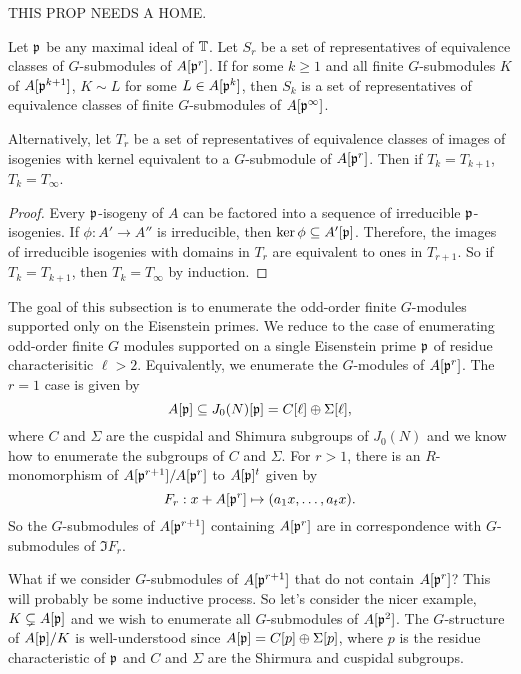 \documentclass{article}
\begin{document}
THIS PROP NEEDS A HOME.
\begin{proposition}\label{prop:powers_of_primes}
    Let $\mathfrak{p}$ be any maximal ideal of $\mathbb{T}$. Let $S_r$ be a set of
    representatives of equivalence classes of $G$-submodules of $A[\mathfrak{p}^r]$. If
    for some $k\geq 1$ and all finite $G$-submodules $K$ of $A[\mathfrak{p}^{k+1}]$,
    $K\sim L$ for some $L\in A[\mathfrak{p}^k]$, then $S_k$ is a set of representatives
    of equivalence classes of finite $G$-submodules of $A[\mathfrak{p}^\infty]$.

    Alternatively, let $T_r$ be a set of representatives of equivalence classes
    of images of isogenies with kernel equivalent to a $G$-submodule of
    $A[\mathfrak{p}^r]$. Then if $T_{k}=T_{k+1}$, $T_k=T_\infty$.
\end{proposition}
\begin{proof}
    Every $\mathfrak{p}$-isogeny of $A$ can be factored into a sequence of irreducible
    $\mathfrak{p}$-isogenies. If $\phi:A'\to A''$ is irreducible, then $\ker\phi\subseteq
    A'[\mathfrak{p}]$. Therefore, the images of irreducible isogenies with domains in
    $T_r$ are equivalent to ones in $T_{r+1}$. So if $T_k=T_{k+1}$, then
    $T_k=T_\infty$ by induction.
\end{proof}

The goal of this subsection is to enumerate the odd-order finite $G$-modules
supported only on the Eisenstein primes. We reduce to the case of
enumerating odd-order finite $G$ modules supported on a single Eisenstein prime
$\mathfrak{p}$ of residue characterisitic $\ell>2$. Equivalently, we enumerate the
$G$-modules of $A[\mathfrak{p}^r]$. The $r=1$ case is given by~\cite[Corollary
16.3]{mazur:eisenstein}
\[
    A[\mathfrak{p}]\subseteq J_0(N)[\mathfrak{p}] = C[\ell] \oplus \Sigma[\ell],
\]
where $C$ and $\Sigma$ are the cuspidal and Shimura subgroups of $J_0(N)$ and
we know how to enumerate the subgroups of $C$ and $\Sigma$. For $r>1$, 
there is an $R$-monomorphism of $A[\mathfrak{p}^{r+1}]/A[\mathfrak{p}^r]$ to $A[\mathfrak{p}]^t$ given by
\[
    F_r:x+A[\mathfrak{p}^r]\mapsto (a_1x,\ldots,a_tx).
\]
So the $G$-submodules of $A[\mathfrak{p}^{r+1}]$ containing $A[\mathfrak{p}^r]$ are in
correspondence with $G$-submodules of $\Im F_r$.

What if we consider $G$-submodules of $A[\mathfrak{p}^{r+1}]$ that do not contain
$A[\mathfrak{p}^r]$? This will probably be some inductive process. So let's consider the
nicer example, $K\subsetneq A[\mathfrak{p}]$ and we wish to enumerate all $G$-submodules
of $A[\mathfrak{p}^2]$. The $G$-structure of $A[\mathfrak{p}]/K$ is well-understood since
$A[\mathfrak{p}]=C[p]\oplus \Sigma[p]$, where $p$ is the residue characteristic of $\mathfrak{p}$
and $C$ and $\Sigma$ are the Shirmura and cuspidal subgroups.
\end{document}
